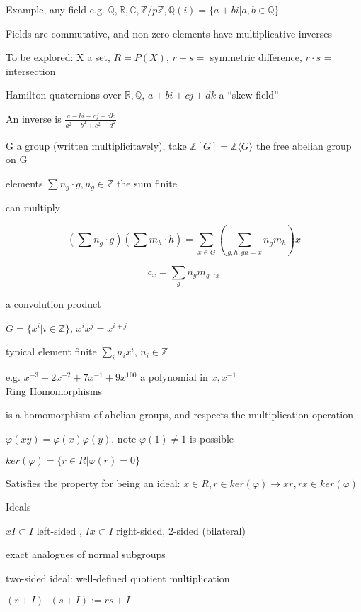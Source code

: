 \documentclass[12pt]{article}
\begin{document}
\noindent
Example, any field e.g. $\mathds{Q}, \mathds{R}, \mathds{C}, \mathds{Z}/p\mathds{Z}, \mathds{Q}(i) = \{a + bi | a, b \in \mathds{Q}\}$

Fields are commutative, and non-zero elements have multiplicative inverses

\noindent
To be explored: X a set, $R = P(X)$, $r + s =$ symmetric difference, $r \cdot s$ = intersection

\noindent
Hamilton quaternions over $\mathds{R}, \mathds{Q}$, $a + bi + cj + dk$ a ``skew field''

An inverse is $\frac{a - bi - cj - dk}{a^2 + b^2 + c^2 + d^2}$

\noindent
G a group (written multiplicitavely), take $\mathds{Z}[G] = \mathds{Z}\langle G \rangle$ the free abelian group on G

elements $\sum n_g \cdot g, n_g \in \mathds{Z}$ the sum finite

can multiply

$$(\sum n_g \cdot g)(\sum m_h \cdot h) = \sum_{x \in G} (\sum_{g, h, gh= x}n_g m_h)x$$

$$c_x = \sum_g n_g m_{g^{-1}x}$$

a convolution product

\noindent
$G = \{x^i | i \in \mathds{Z}\}$, $x^ix^j = x^{i + j}$

typical element finite $\sum_i n_i x^i$, $n_i \in \mathds{Z}$

e.g. $x^{-3} + 2x^{-2} + 7x^{-1} + 9x^{100}$ a polynomial in $x, x^{-1}$\\

\noindent
Ring Homomorphisms

is a homomorphism of abelian groups, and respects the multiplication operation

$\varphi(xy) = \varphi(x)\varphi(y)$, note $\varphi(1) \neq 1$ is possible

$ker(\varphi) = \{r \in R | \varphi(r) = 0\}$

Satisfies the property for being an ideal: $x \in R, r \in ker(\varphi) \to xr, rx \in ker(\varphi)$

\noindent
Ideals

$xI \subset I$ left-sided , $Ix \subset I$ right-sided, 2-sided (bilateral)

exact analogues of normal subgroups

\noindent
two-sided ideal: well-defined quotient multiplication

$(r + I) \cdot (s + I) := rs + I$
\end{document}
